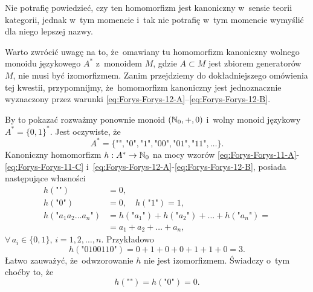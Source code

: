 \documentclass[a4paper,11pt]{article}
\begin{document}
Nie potrafię powiedzieć, czy ten homomorfizm jest kanoniczny w~sensie teorii
kategorii, jednak w~tym momencie i~tak nie potrafię w~tym momencie wymyślić
dla niego lepszej nazwy.

\vspace{\spaceFour}





\start {} Warto zwrócić uwagę na to, że~omawiany tu homomorfizm
kanoniczny wolnego monoidu językowego $A^{ * }$ z~monoidem $M$, gdzie
$A \subset M$ jest zbiorem generatorów $M$, nie musi być izomorfizmem. Zanim
przejdziemy do dokładniejszego omówienia tej kwestii, przypomnijmy,
że~homomorfizm kanoniczny jest jednoznacznie wyznaczony przez warunki
\eqref{eq:Forys-Forys-12-A}--\eqref{eq:Forys-Forys-12-B}.

By to pokazać rozważmy
ponownie monoid $( \mathbb{N}_{ 0 }, +, 0 )$ i~wolny monoid językowy
$A^{ * } = \{ 0, 1 \}^{ * }$. Jest
oczywiste, że
\begin{equation}
  \label{eq:Forys-Forys-13}
  A^{ * } =
  \{ \texttt{""}, \texttt{"} 0 \texttt{"}, \texttt{"} 1 \texttt{"},
  \texttt{"} 0 0 \texttt{"}, \texttt{"} 0 1 \texttt{"},
  \texttt{"} 1 1 \texttt{"}, \ldots \}.
\end{equation}
Kanoniczny homomorfizm $h : A^{ * } \to \mathbb{N}_{ 0 }$ na mocy wzorów
\eqref{eq:Forys-Forys-11-A}-\eqref{eq:Forys-Forys-11-C}
i~\eqref{eq:Forys-Forys-12-A}-\eqref{eq:Forys-Forys-12-B}, posiada
następujące własności
\begin{subequations}
  \begin{align}
    \label{eq:Forys-Forys-14-A}
    h( \texttt{""} ) &= 0, \\
    \label{eq:Forys-Forys-14-B}
    h( \texttt{"} 0 \texttt{"} ) &= 0, \quad
    h( \texttt{"} 1 \texttt{"} ) = 1, \\
    \label{eq:Forys-Forys-14-C}
    h( \texttt{"} a_{ 1 } a_{ 2 } \ldots a_{ n } \texttt{"} )
                     &= h( \texttt{"} a_{ 1 } \texttt{"} )
                       + h( \texttt{"} a_{ 2 } \texttt{"} ) + \ldots
                       + h( \texttt{"} a_{ n } \texttt{"} ) = \\
                     &= a_{ 1 } + a_{ 2 } + \ldots + a_{ n },
  \end{align}
\end{subequations}
$\forall \, a_{ i } \in \{ 0, 1 \}$, $i = 1, 2, \ldots, n$. Przykładowo
\begin{equation}
  \label{eq:Forys-Forys-15}
  h( \texttt{"} 0100110 \texttt{"} ) =
  0 + 1 + 0 + 0 + 1 + 1 + 0 = 3.
\end{equation}
Łatwo zauważyć, że~odwzorowanie $h$ nie jest izomorfizmem. Świadczy o~tym
choćby to, że
\begin{equation}
  \label{eq:Forys-Forys-16}
  h( \texttt{""} ) = h( \texttt{"} 0 \texttt{"} ) = 0.
\end{equation}
\end{document}
